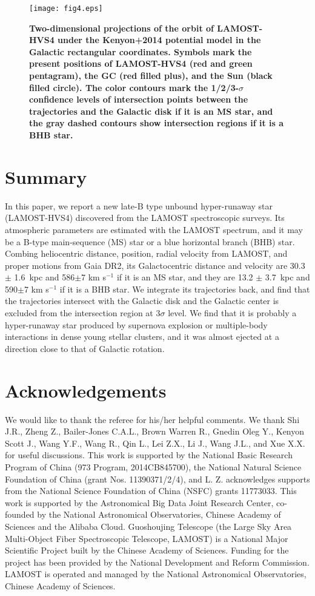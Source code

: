 \documentclass[iop, aj]{emulateapj}
\begin{document}
\begin{figure*}
\begin{center}
\texttt{[image: fig4.eps]}
\caption{\textbf{Two-dimensional projections of the orbit of LAMOST-HVS4 under the Kenyon+2014 potential model in the Galactic rectangular coordinates. Symbols mark the present positions of LAMOST-HVS4 (red and green pentagram), the GC (red filled plus), and the Sun (black filled circle). The color contours mark the 1/2/3-$\sigma$ confidence levels of intersection points between the trajectories and the Galactic disk if it is an MS star, and the gray dashed contours show intersection regions if it is a BHB star.}\label{fig:origin_place}}
\end{center}
\end{figure*}


\section{Summary}
In this paper, we report a new late-B type unbound hyper-runaway star (LAMOST-HVS4) discovered from the LAMOST spectroscopic surveys. Its atmospheric parameters are estimated with the LAMOST spectrum, and it may be a B-type main-sequence (MS) star or a blue horizontal branch (BHB) star. Combing heliocentric distance, position, radial velocity from LAMOST, and proper motions from Gaia DR2, its Galactocentric distance and velocity are 30.3 $\pm$ 1.6~kpc and 586$\pm$7 km s$^{-1}$ if it is an MS star, and they are 13.2 $\pm$ 3.7~kpc and 590$\pm$7 km s$^{-1}$ if it is a BHB star. We integrate its trajectories back, and find that the trajectories intersect with the Galactic disk and the Galactic center is excluded from the intersection region at 3$\sigma$ level. We find that it is probably a hyper-runaway star produced by supernova explosion or multiple-body interactions in dense young stellar clusters, and it was almost ejected at a direction close to that of Galactic rotation.

\section*{Acknowledgements}
We would like to thank the referee for his/her helpful comments.
We thank Shi J.R., Zheng Z., Bailer-Jones C.A.L., Brown Warren R., Gnedin Oleg Y., Kenyon Scott J., Wang Y.F., Wang R., Qin L., Lei Z.X., Li J., Wang J.L., and Xue X.X. for useful discussions.
This work is supported by the National Basic Research Program of China (973 Program, 2014CB845700), the National Natural Science Foundation of China (grant Nos. 11390371/2/4), and L. Z. acknowledges supports from the National Science Foundation of China (NSFC) grants 11773033. This work is supported by the Astronomical Big Data Joint Research Center, co-founded by the National Astronomical Observatories, Chinese Academy of Sciences and the Alibaba Cloud. Guoshoujing Telescope (the Large Sky Area Multi-Object Fiber Spectroscopic Telescope, LAMOST) is a National Major Scientific Project built by the Chinese Academy of Sciences. Funding for the project has been provided by the National Development and Reform Commission. LAMOST is operated and managed by the National Astronomical Observatories, Chinese Academy of Sciences.
\end{document}

